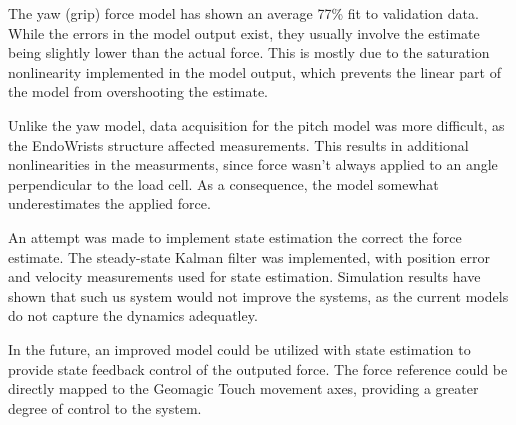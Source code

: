 The yaw (grip) force model has shown an average 77\% fit to validation data.
While the errors in the model output exist, they usually involve the estimate being slightly lower than the actual force.
This is mostly due to the saturation nonlinearity implemented in the model output, which prevents the linear part of the model from overshooting the estimate.

Unlike the yaw model, data acquisition for the pitch model was more difficult, as the EndoWrists structure affected measurements.
This results in additional nonlinearities in the measurments, since force wasn't always applied to an angle perpendicular to the load cell.
As a consequence, the model somewhat underestimates the applied force.

An attempt was made to implement state estimation the correct the force estimate.
The steady-state Kalman filter was implemented, with position error and velocity measurements used for state estimation.
Simulation results have shown that such us system would not improve the systems, as the current models do not capture the dynamics adequatley.

In the future, an improved model could be utilized with state estimation to provide state feedback control of the outputed force.
The force reference could be directly mapped to the Geomagic Touch movement axes, providing a greater degree of control to the system.













